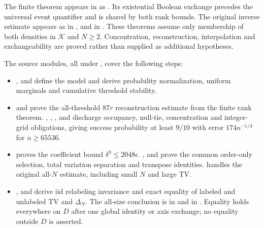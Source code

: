 \documentclass[11pt]{article}
\theoremstyle{remark}
\newcommand{\K}{\mathcal K}
\begin{document}
The finite theorem appears in  as
. Its existential Boolean
exchange precedes the universal event quantifier and is shared by both
rank bounds. The original inverse estimate appears as
 in , and
 in .
These theorems assume only membership of both densities in $\K$ and
$N\ge2$. Concentration, reconstruction, interpolation and exchangeability
are proved rather than supplied as additional hypotheses.

The source modules, all under , cover the
following steps:
\begin{itemize}
\item {},  and 
define the model and derive probability normalization, uniform marginals
and cumulative threshold stability.
\item {} and  prove the
all-threshold $87r$ reconstruction estimate from the finite rank theorem.
, , ,
 and  discharge occupancy,
null-tie, concentration and integer-grid obligations, giving success
probability at least $9/10$ with error $174n^{-1/4}$ for $n\ge65536$.
\item {} proves the coefficient bound
$\delta^3\le2048\epsilon$. , 
and  prove the common order-only selection, total
variation separation and transpose identities. 
handles the original all-$N$ estimate, including small $N$ and large TV.
\item {},  and
 derive iid relabeling invariance and exact equality
of labeled and unlabeled TV and $\Delta_N$. The all-size conclusion is
 in 
and  in
. Equality holds everywhere on $D$ after one global
identity or axis exchange; no equality outside $D$ is asserted.
\end{itemize}
\end{document}
